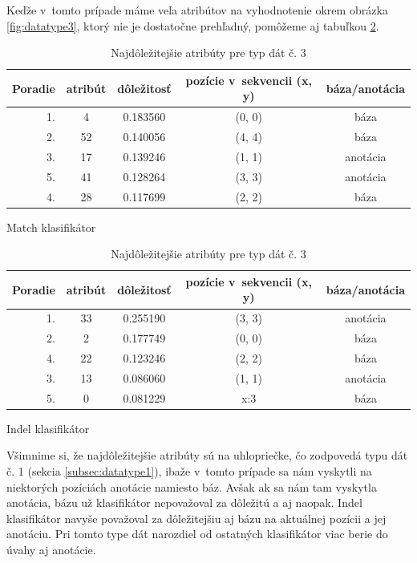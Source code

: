 Keďže v~tomto prípade máme veľa atribútov na vyhodnotenie okrem obrázka \ref{fig:datatype3}, ktorý nie je dostatočne prehľadný, pomôžeme aj tabuľkou \ref{tab:datatype3}.
\begin{table}[htp]
\centering
\begin{subtable}{\textwidth}
\centering
\begin{tabular}{r|cccc}
Poradie & atribút & dôležitosť & pozície v~sekvencii (x, y) & báza/anotácia\\
\hline
1. & 4 & 0.183560 & (0, 0) & báza\\
2. & 52 & 0.140056 & (4, 4) & báza\\
3. & 17 & 0.139246 & (1, 1) & anotácia\\
5. & 41 & 0.128264 & (3, 3) & anotácia\\
4. & 28 & 0.117699 & (2, 2) & báza\\
\end{tabular}
\caption{Match klasifikátor}
\end{subtable}

\begin{subtable}{\textwidth}
\centering
\begin{tabular}{r|cccc}
Poradie & atribút & dôležitosť & pozície v~sekvencii (x, y) & báza/anotácia\\
\hline
1. & 33 & 0.255190 & (3, 3) & anotácia\\
2. & 2 & 0.177749 & (0, 0) & báza\\
4. & 22 & 0.123246 & (2, 2) & báza\\
3. & 13 & 0.086060 & (1, 1) & anotácia\\
5. & 0 & 0.081229 & x:3 & báza\\
\end{tabular}
\caption{Indel klasifikátor}
\end{subtable}
\caption[Najdôležitejšie atribúty pre typ dát č. 3]{Najdôležitejšie atribúty pre typ dát č. 3}
\label{tab:datatype3}
\end{table}

Všimnime si, že najdôležitejšie atribúty sú na uhlopriečke, čo zodpovedá typu dát č. 1 (sekcia \ref{subsec:datatype1}), ibaže v~tomto prípade sa nám vyskytli na niektorých pozíciách anotácie namiesto báz.
Avšak ak sa nám tam vyskytla anotácia, bázu už klasifikátor nepovažoval za dôležitú a aj naopak.
Indel klasifikátor navyše považoval za dôležitejšiu aj bázu na aktuálnej pozícii a jej anotáciu.
Pri tomto type dát narozdiel od ostatných klasifikátor viac berie do úvahy aj anotácie.

